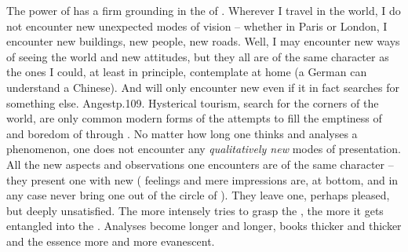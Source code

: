 \pa The power of  has a firm grounding in the
 of . Wherever I travel in the world, I do not
encounter new unexpected modes of vision -- whether in Paris or London, I
encounter new buildings, new people, new roads. Well, I may encounter new ways
of seeing the world and new attitudes, but they all are of the same character as
the ones I could, at least in principle, contemplate at home (a German can
understand a Chinese). And 
 will only encounter new  even if it in fact searches
for something else. \citet{Life is, however, rich enough when one only can see;
  one need not travel to Paris and London -- and that does not help, when one
  can not see.}{Angest}{p.109.   Hysterical tourism, search
  for the  corners of the world, are only common
  modern forms of the attempts to fill the emptiness of  and
  boredom of  through  .}  No matter
how long one thinks and  analyses a phenomenon, one does not
encounter any {\em qualitatively new} modes of presentation. All the new aspects
and observations one encounters are of the same character -- they present one
with new  ( feelings and mere  impressions
are, at bottom,  and in any case never bring one out of the
circle of ). They leave one, perhaps pleased, but deeply
unsatisfied. The more intensely  tries to grasp the ,
the more it gets entangled into the . Analyses become
longer and longer, books thicker and thicker and the essence more and more
evanescent.


\label{sub:antinomies}\label{antinomies}

